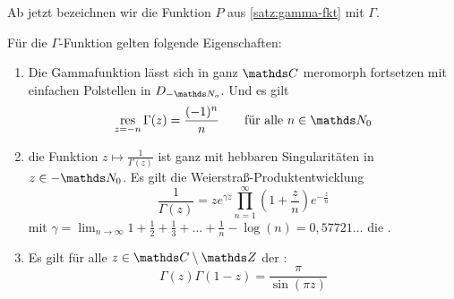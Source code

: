 \begin{nota}
Ab jetzt bezeichnen wir die Funktion $P$ aus \autoref{satz:gamma-fkt} mit $\Gamma$.
\end{nota}

\begin{satz}\label{satz:gamma-eigenschaften}
Für die $\Gamma$-Funktion gelten folgende Eigenschaften:
\begin{enumerate}
\item Die Gammafunktion lässt sich in ganz $\CC$ meromorph fortsetzen mit einfachen Polstellen in $D_{-\NN_o}$. Und es gilt
\[
	\res_{z=-n} \Gamma(z)
	= \frac{(-1)^n}{n}
	\qquad \text{für alle } n\in\NN_0
\]

\item die Funktion $z\mapsto \frac{1}{\Gamma(z)}$ ist ganz mit hebbaren Singularitäten in $z\in-\NN_0$. Es gilt die Weierstraß-Produktentwicklung
\[
	\frac{1}{\Gamma(z)} = ze^{\gamma z} \prod_{n=1}^\infty \left(1+\frac{z}{n}\right)e^{-\frac{z}{n}}
\]
mit $\gamma = \lim_{n\to\infty} 1 + \frac{1}{2} + \frac{1}{3} + \ldots + \frac{1}{n} - \log(n) = 0,57721\dots$ die .

\item Es gilt für alle $z\in\CC\setminus\ZZ$ der :
\[
	\Gamma(z)\Gamma(1-z)
	= \frac{\pi}{\sin(\pi z)}
\]
\end{enumerate}
\end{satz}

